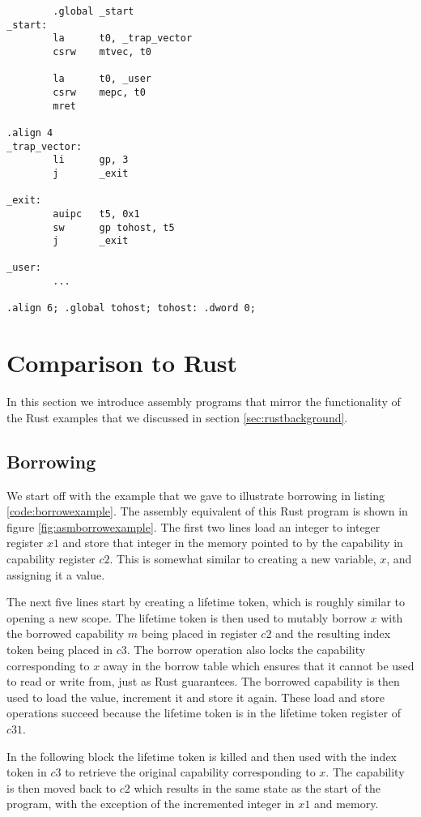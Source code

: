 \begin{verbatim}
        .global _start
_start:
        la      t0, _trap_vector
        csrw	mtvec, t0

        la      t0, _user
        csrw    mepc, t0
        mret

.align 4
_trap_vector:
        li      gp, 3
        j       _exit

_exit:
        auipc   t5, 0x1
        sw      gp tohost, t5
        j       _exit

_user:
        ...

.align 6; .global tohost; tohost: .dword 0;
\end{verbatim}

\section{Comparison to Rust}
In this section we introduce assembly programs that mirror the functionality of the Rust examples that we discussed in section \ref{sec:rustbackground}.
\subsection{Borrowing}
We start off with the example that we gave to illustrate borrowing in listing \ref{code:borrowexample}.
The assembly equivalent of this Rust program is shown in figure \ref{fig:asmborrowexample}.
The first two lines load an integer to integer register $x1$ and store that integer in the memory pointed to by the capability in capability register $c2$.
This is somewhat similar to creating a new variable, $x$, and assigning it a value.

The next five lines start by creating a lifetime token, which is roughly similar to opening a new scope.
The lifetime token is then used to mutably borrow $x$ with the borrowed capability $m$ being placed in register $c2$ and the resulting index token being placed in $c3$.
The borrow operation also locks the capability corresponding to $x$ away in the borrow table which ensures that it cannot be used to read or write from, just as Rust guarantees.
The borrowed capability is then used to load the value, increment it and store it again.
These load and store operations succeed because the lifetime token is in the lifetime token register of $c31$.

In the following block the lifetime token is killed and then used with the index token in $c3$ to retrieve the original capability corresponding to $x$.
The capability is then moved back to $c2$ which results in the same state as the start of the program, with the exception of the incremented integer in $x1$ and memory.

